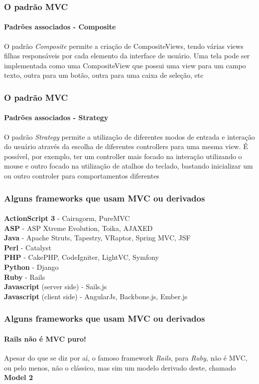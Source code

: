 \documentclass{beamer}
\begin{document}
\begin{frame}
\frametitle{O padrão MVC}
\framesubtitle{Padrões associados - Composite}
	O padrão \textit{Composite} permite a criação de CompositeViews, tendo várias views filhas responsáveis por cada elemento da interface de usuário. Uma tela pode ser implementada como uma CompositeView que possui uma view para um campo texto, outra para um botão, outra para uma caixa de seleção, etc
\end{frame}

\begin{frame}
\frametitle{O padrão MVC}
\framesubtitle{Padrões associados - Strategy}
	O padrão \textit{Strategy} permite a utilização de diferentes modos de entrada e interação do usuário através da escolha de diferentes controllers para uma mesma view. É possível, por exemplo, ter um controller mais focado na interação utilizando o mouse e outro focado na utilização de atalhos do teclado, bastando inicializar um ou outro controler para comportamentos diferentes
\end{frame}

\begin{frame}
\frametitle{Alguns frameworks que usam MVC ou derivados}
\framesubtitle{}
	\textbf{ActionScript 3} - Cairngorm, PureMVC\\
	\textbf{ASP} - ASP Xtreme Evolution, Toika, AJAXED\\
	\textbf{Java} - Apache Struts, Tapestry, VRaptor, Spring MVC, JSF\\
	\textbf{Perl} - Catalyst\\
	\textbf{PHP} - CakePHP, CodeIgniter, LightVC, Symfony\\
	\textbf{Python} - Django\\
	\textbf{Ruby} - Rails\\
	\textbf{Javascript} (server side) - Sails.js\\
	\textbf{Javascript} (client side) - AngularJs, Backbone.js, Ember.js\\
\end{frame}

\begin{frame}
\frametitle{Alguns frameworks que usam MVC ou derivados}
\framesubtitle{Rails não é MVC puro!}
	Apesar do que se diz por aí, o famoso framework \textit{Rails}, para \textit{Ruby}, não é MVC, ou pelo menos, não o clássico,
	mas sim um modelo derivado deste, chamado \textbf{Model 2}
\end{frame}
\end{document}
